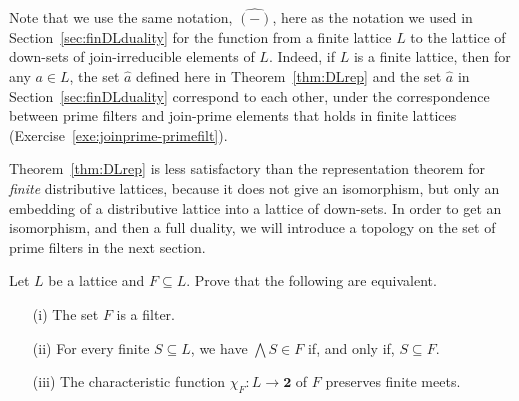 Note that we use the same notation, $\widehat{(-)}$, here as the notation we used in Section~\ref{sec:finDLduality} for the function from a finite lattice $L$ to the lattice of down-sets of join-irreducible elements of $L$. Indeed, if $L$ is a finite lattice, then for any $a \in L$,  the set $\widehat{a}$ defined here in Theorem~\ref{thm:DLrep} and the set $\widehat{a}$ in Section~\ref{sec:finDLduality} correspond to each other, under the correspondence between prime filters and join-prime elements that holds in finite lattices (Exercise~\ref{exe:joinprime-primefilt}).


Theorem~\ref{thm:DLrep} is less satisfactory than the representation theorem for \emph{finite} distributive lattices, because it does not give an isomorphism, but only an embedding of a distributive lattice into a lattice of down-sets. In order to get an isomorphism, and then a full duality, we will introduce a topology on the set of prime filters in the next section.

\exercises
\begin{exercise}\label{exe:finitemeets}
Let $L$ be a lattice and $F \subseteq L$. Prove that the following are equivalent.
\begin{enumerate}
\item[(i)] The set $F$ is a filter.
\item[(ii)] For every finite $S \subseteq L$, we have $\bigwedge S \in F$ if, and only if, $S \subseteq F$.
\item[(iii)] The characteristic function $\chi_F \colon L \to \mathbf{2}$ of $F$ preserves finite meets.
\end{enumerate}
\end{exercise}

